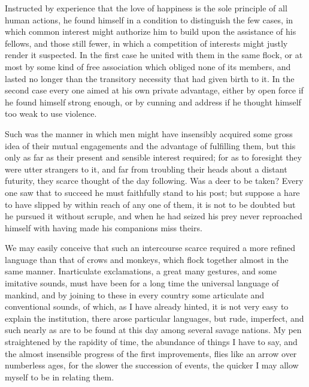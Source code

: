 \documentclass[11pt,twocolumn]{ltugboat}
\begin{document}
Instructed by experience that the love of happiness is the sole
principle of all human actions, he found himself in a condition to
distinguish the few cases, in which common interest might authorize
him to build upon the assistance of his fellows, and those still
fewer, in which a competition of interests might justly render it
suspected. In the first case he united with them in the same flock, or
at most by some kind of free association which obliged none of its
members, and lasted no longer than the transitory necessity that had
given birth to it. In the second case every one aimed at his own
private advantage, either by open force if he found himself strong
enough, or by cunning and address if he thought himself too weak to
use violence.

Such was the manner in which men might have insensibly acquired some
gross idea of their mutual engagements and the advantage of fulfilling
them, but this only as far as their present and sensible interest
required; for as to foresight they were utter strangers to it, and far
from troubling their heads about a distant futurity, they scarce
thought of the day following. Was a deer to be taken? Every one saw
that to succeed he must faithfully stand to his post; but suppose a
hare to have slipped by within reach of any one of them, it is not to
be doubted but he pursued it without scruple, and when he had seized
his prey never reproached himself with having made his companions miss
theirs.

We may easily conceive that such an intercourse scarce required a more
refined language than that of crows and monkeys, which flock together
almost in the same manner. Inarticulate exclamations, a great many
gestures, and some imitative sounds, must have been for a long time
the universal language of mankind, and by joining to these in every
country some articulate and conventional sounds, of which, as I have
already hinted, it is not very easy to explain the institution, there
arose particular languages, but rude, imperfect, and such nearly as
are to be found at this day among several savage nations. My pen
straightened by the rapidity of time, the abundance of things I have
to say, and the almost insensible progress of the first improvements,
flies like an arrow over numberless ages, for the slower the
succession of events, the quicker I may allow myself to be in relating
them.
\end{document}
